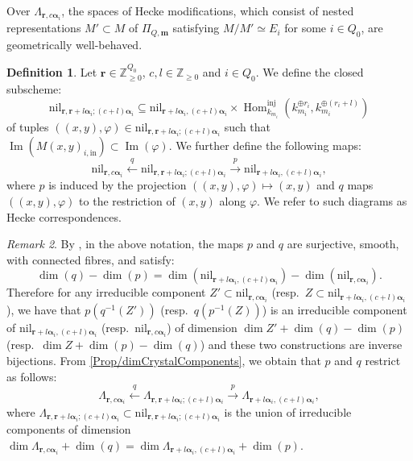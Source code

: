 \documentclass[a4paper,12pt]{article}
\theoremstyle{definition}
\newtheorem{definition}{Definition}[section]
\theoremstyle{plain}
\theoremstyle{remark}
\newtheorem{remark}[definition]{Remark}
\DeclareMathOperator{\Hom}{Hom}
\DeclareMathOperator{\Ima}{Im}
\newcommand\bbZ{\mathbb{Z}}
\newcommand\bfalpha{\bm{\alpha}}
\newcommand\bfm{\mathbf{m}}
\newcommand\bfr{\mathbf{r}}
\begin{document}
Over $\Lambda_{\bfr,c\bfalpha_i}$, the spaces of Hecke modifications, which consist of nested representations $M'\subset M$ of $\Pi_{Q,\bfm}$ satisfying $M/M'\simeq E_i$ for some $i\in Q_0$, are geometrically well-behaved.

\begin{definition}\label{def/quiverHeckeCorrespondence}
Let $\bfr\in\bbZ_{\geq0}^{Q_0}$, $c,l\in\bbZ_{\geq0}$ and $i\in Q_0$. We define the closed subscheme:
\[
\mathrm{nil}_{\bfr,\bfr+l\bfalpha_i;(c+l)\bfalpha_i}
\subseteq 
\mathrm{nil}_{\bfr+l\bfalpha_i,(c+l)\bfalpha_i}\times\Hom_{k_{m_i}}^{\mathrm{inj}}(k_{m_i}^{\oplus r_i},k_{m_i}^{\oplus (r_i+l)})
\]
of tuples $((x,y),\varphi)\in\mathrm{nil}_{\bfr,\bfr+l\bfalpha_i;(c+l)\bfalpha_i}$ such that $\Ima(M(x,y)_{i,\mathrm{in}})\subset\Ima(\varphi)$. We further define the following maps:
\[
\mathrm{nil}_{\bfr,c\bfalpha_i}
\overset{q}{\longleftarrow}
\mathrm{nil}_{\bfr,\bfr+l\bfalpha_i;(c+l)\bfalpha_i}
\overset{p}{\longrightarrow}
\mathrm{nil}_{\bfr+l\bfalpha_i,(c+l)\bfalpha_i}
,
\]
where $p$ is induced by the projection $((x,y),\varphi)\mapsto (x,y)$ and $q$ maps $((x,y),\varphi)$ to the restriction of $(x,y)$ along $\varphi$. We refer to such diagrams as Hecke correspondences.
\end{definition}

\begin{remark}\label{Rem/restrictionHeckeCorrespondence}
By \cite[Lem.\ 3.4-3.6]{GLS18a}, in the above notation, the maps $p$ and $q$ are surjective, smooth, with connected fibres, and satisfy:
\[
\dim(q)-\dim(p)=\dim(\mathrm{nil}_{\bfr+l\bfalpha_i,(c+l)\bfalpha_i})-\dim(\mathrm{nil}_{\bfr,c\bfalpha_i})
.
\]
Therefore for any irreducible component $Z'\subset\mathrm{nil}_{\bfr,c\bfalpha_i}$ (resp.\ $Z\subset\mathrm{nil}_{\bfr+l\bfalpha_i,(c+l)\bfalpha_i}$), we have that $p(q^{-1}(Z'))$ (resp.\ $q(p^{-1}(Z))$) is an irreducible component of $\mathrm{nil}_{\bfr+l\bfalpha_i,(c+l)\bfalpha_i}$ (resp.\ $\mathrm{nil}_{\bfr,c\bfalpha_i}$) of dimension $\dim Z'+\dim(q)-\dim(p)$ (resp.\ $\dim Z+\dim(p)-\dim(q)$) and these two constructions are inverse bijections. From \cref{Prop/dimCrystalComponents}, we obtain that $p$ and $q$ restrict as follows:
\[
\Lambda_{\bfr,c\bfalpha_i}
\overset{q}{\longleftarrow}
\Lambda_{\bfr,\bfr+l\bfalpha_i;(c+l)\bfalpha_i}
\overset{p}{\longrightarrow}
\Lambda_{\bfr+l\bfalpha_i,(c+l)\bfalpha_i}
,
\]
where $\Lambda_{\bfr,\bfr+l\bfalpha_i;(c+l)\bfalpha_i}\subset\mathrm{nil}_{\bfr,\bfr+l\bfalpha_i;(c+l)\bfalpha_i}$ is the union of irreducible components of dimension $\dim\Lambda_{\bfr,c\bfalpha_i}+\dim(q)=\dim\Lambda_{\bfr+l\bfalpha_i,(c+l)\bfalpha_i}+\dim(p)$.
\end{remark}
\end{document}
